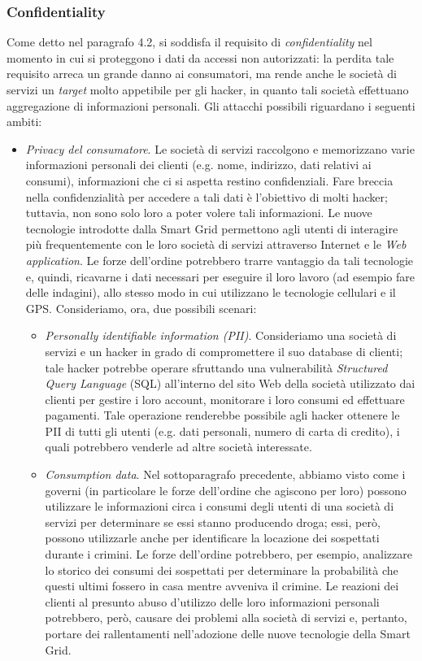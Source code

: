 \subsubsection{Confidentiality}
Come detto nel paragrafo 4.2, si soddisfa il requisito di \textit{confidentiality} nel momento in cui si proteggono i dati da accessi non autorizzati: la perdita tale requisito arreca un grande danno ai consumatori, ma rende anche le società di servizi un \textit{target} molto appetibile per gli hacker, in quanto tali società effettuano aggregazione di informazioni personali. Gli attacchi possibili riguardano i seguenti ambiti:
\begin{itemize}
\item \textit{Privacy del consumatore}. Le società di servizi raccolgono e memorizzano varie informazioni personali dei clienti (e.g. nome, indirizzo, dati relativi ai consumi), informazioni che ci si aspetta restino confidenziali. Fare breccia nella confidenzialità per accedere a tali dati è l'obiettivo di molti hacker; tuttavia, non sono solo loro a poter volere tali informazioni. Le nuove tecnologie introdotte dalla Smart Grid permettono agli utenti di interagire più frequentemente con le loro società di servizi attraverso Internet e le \textit{Web application}. Le forze dell'ordine potrebbero trarre vantaggio da tali tecnologie e, quindi, ricavarne i dati necessari per eseguire il loro lavoro (ad esempio fare delle indagini), allo stesso modo in cui utilizzano le tecnologie cellulari e il GPS. Consideriamo, ora, due possibili scenari:
	\begin{itemize}
	\item \textit{Personally identifiable information (PII)}. Consideriamo una società di servizi e un hacker in grado di compromettere il suo database di clienti; tale hacker potrebbe operare sfruttando una vulnerabilità \textit{Structured Query Language} (SQL) all'interno del sito Web della società utilizzato dai clienti per gestire i loro account, monitorare i loro consumi ed effettuare pagamenti. Tale operazione renderebbe possibile agli hacker ottenere le PII  di tutti gli utenti (e.g. dati personali, numero di carta di credito), i quali potrebbero venderle ad altre società interessate.
	\item \textit{Consumption data}. Nel sottoparagrafo precedente, abbiamo visto come i governi (in particolare le forze dell'ordine che agiscono per loro) possono utilizzare le informazioni circa i consumi degli utenti di una società di servizi per determinare se essi stanno producendo droga; essi, però, possono utilizzarle anche per identificare la locazione dei sospettati durante i crimini. Le forze dell'ordine potrebbero, per esempio, analizzare lo storico dei consumi dei sospettati per determinare la probabilità che questi ultimi fossero in casa mentre avveniva il crimine. Le reazioni dei clienti al presunto abuso d'utilizzo delle loro informazioni personali potrebbero, però, causare dei problemi alla società di servizi e, pertanto, portare dei rallentamenti nell'adozione delle nuove tecnologie della Smart Grid.

\end{itemize}
\end{itemize}
